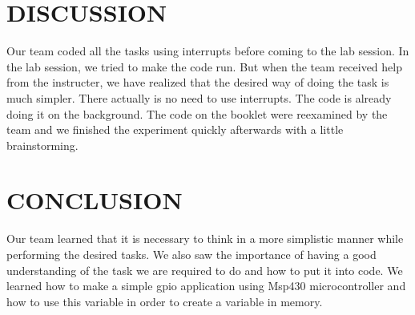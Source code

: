 \documentclass[pdftex,12pt,a4paper]{article}
\begin{document}
\section{DISCUSSION}

\newline{}
Our team coded all the tasks using interrupts before coming to the lab session. In the lab session, we tried to make the code run. But when the team received help from the instructer, we have realized that the desired way of doing the task is much simpler. There actually is no need to use interrupts. The code is already doing it on the background. The code on the booklet were reexamined by the team and we finished the experiment quickly afterwards with a little brainstorming.


\section{CONCLUSION}

Our team learned that it is necessary to think in a more simplistic manner while performing the desired tasks. We also saw the importance of having a good understanding of the task we are required to do and how to put it into code. We learned how to make a simple gpio application using Msp430 microcontroller and  how to use this variable in order to create a variable in memory.



\nocite{overleaf}
\nocite{reportGuide}
\newpage
{}



\end{document}
